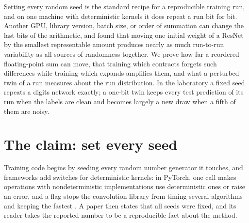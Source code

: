 \newcommand{\instabilityfl}{\operatorname{fl}}

\begin{refsection}

\begin{chaptersummary}
Setting every random seed is the standard recipe for a reproducible training run, and on one machine with deterministic kernels it does repeat a run bit for bit. Another GPU, library version, batch size, or order of summation can change the last bits of the arithmetic, and \textcite{SummersDinneen2021} found that moving one initial weight of a ResNet by the smallest representable amount produces nearly as much run-to-run variability as all sources of randomness together. We prove how far a reordered floating-point sum can move, that training which contracts forgets such differences while training which expands amplifies them, and what a perturbed twin of a run measures about the run distribution. In the laboratory a fixed seed repeats a digits network exactly; a one-bit twin keeps every test prediction of its run when the labels are clean and becomes largely a new draw when a fifth of them are noisy.
\end{chaptersummary}

\section{The claim: set every seed}\label{sec:instability:claim}

Training code begins by seeding every random number generator it touches, and frameworks add switches for deterministic kernels: in PyTorch, one call makes operations with nondeterministic implementations use deterministic ones or raise an error, and a flag stops the convolution library from timing several algorithms and keeping the fastest \parencite{PyTorchReproducibility}. A paper then states that all seeds were fixed, and its reader takes the reported number to be a reproducible fact about the method.


\end{refsection}
